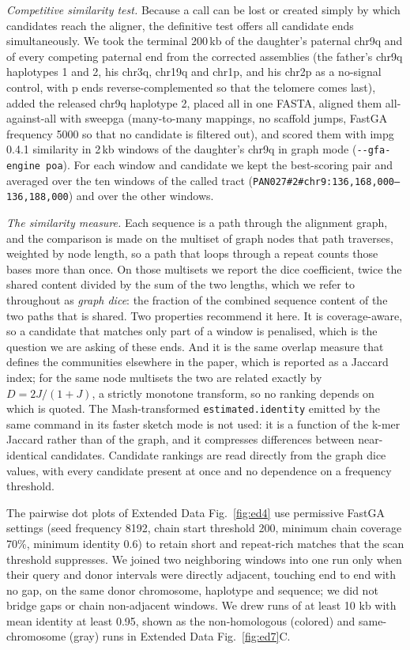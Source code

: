 \documentclass[pdflatex,mathphys]{jnl}
\begin{document}
\emph{Competitive similarity test.} Because a call can be lost or created simply by which candidates reach
the aligner, the definitive test offers all candidate ends simultaneously. We took the terminal 200\,kb of
the daughter's paternal chr9q and of every competing paternal end from the corrected assemblies (the
father's chr9q haplotypes 1 and 2, his chr3q, chr19q and chr1p, and his chr2p as a no-signal control,
with p ends reverse-complemented so that the telomere comes last), added the released chr9q haplotype 2,
placed all in one FASTA, aligned them all-against-all with sweepga (many-to-many mappings, no scaffold
jumps, FastGA frequency 5000 so that no candidate is filtered out), and scored them with impg 0.4.1
similarity in 2\,kb windows of the daughter's chr9q in graph mode (\texttt{-{}-gfa-engine poa}). For each
window and candidate we kept the best-scoring pair and averaged over the ten windows of the called tract
(\texttt{PAN027\#2\#chr9:136,168,000--136,188,000}) and over the other windows.

\emph{The similarity measure.} Each sequence is a path through the alignment graph, and the comparison is
made on the multiset of graph nodes that path traverses, weighted by node length, so a path that loops
through a repeat counts those bases more than once. On those multisets we report the dice coefficient, twice the shared content divided by the sum of the two lengths,
which we refer to throughout as \emph{graph dice}: the fraction of the combined sequence content of the
two paths that is shared. Two properties recommend it here. It is coverage-aware,
so a candidate that matches only part of a window is penalised, which is the question we are asking of
these ends. And it is the same overlap measure that defines the communities elsewhere in the paper, which
is reported as a Jaccard index; for the same node multisets the two are related exactly by
$D=2J/(1+J)$, a strictly monotone transform, so no ranking depends on which is quoted. The Mash-transformed \texttt{estimated.identity} emitted by the same command
in its faster sketch mode is not used: it is a function of the k-mer Jaccard rather than of the graph,
and it compresses differences between near-identical candidates. Candidate rankings are read directly from
the graph dice values, with every candidate present at once and no dependence on a frequency threshold.

The pairwise dot plots of Extended Data Fig.~\ref{fig:ed4} use permissive FastGA settings (seed
frequency 8192, chain start threshold 200, minimum chain coverage 70\%, minimum identity 0.6) to retain
short and repeat-rich matches that the scan threshold suppresses. We joined two
neighboring windows into one run only when their query and donor intervals were
directly adjacent, touching end to end with no gap, on the same donor
chromosome, haplotype and sequence; we did not bridge gaps or chain non-adjacent
windows. We drew runs of at least 10 kb with mean identity at least 0.95, shown
as the non-homologous (colored) and same-chromosome (gray) runs in
Extended Data Fig.~\ref{fig:ed7}C.
\end{document}
